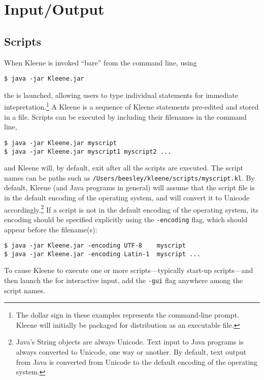 \section{Input/Output}

\subsection{Scripts}

When Kleene is invoked ``bare'' from the command line, using

\begin{Verbatim}
$ java -jar Kleene.jar
\end{Verbatim}

\noindent
the  is launched, allowing users to type individual statements
for immediate intepretation.\footnote{The dollar sign in these examples
	represents the command-line prompt.  Kleene will initially be
	packaged for distribution as an executable  file.} A Kleene
	 is a sequence of Kleene statements pre-edited and
	stored in a file.  Scripts can be executed by including their
	filenames in the command line,

\begin{Verbatim}
$ java -jar Kleene.jar myscript
$ java -jar Kleene.jar myscript1 myscript2 ...
\end{Verbatim}

\noindent
and Kleene will, by default, exit after all the scripts are executed.
The script names can be paths such as
\texttt{/Users/beesley/kleene/scripts/myscript.kl}.  By default, Kleene
(and Java programs in general) will assume that the script file is in the
default encoding of the operating system, and will convert it to Unicode
accordingly.\footnote{Java's String objects are always Unicode.  Text
input to Java programs is always converted to Unicode, one way or
another.  By default, text output from Java is converted from Unicode to
the default encoding of the operating system.}  If a script is not in the
default encoding of the operating system, its encoding should be specified
explicitly using the \texttt{-encoding} flag, which should appear before
the filename(s):

\begin{Verbatim}
$ java -jar Kleene.jar -encoding UTF-8    myscript
$ java -jar Kleene.jar -encoding Latin-1  myscript ...
\end{Verbatim}

\noindent
To cause Kleene to execute one or more scripts---typically start-up
scripts---and then launch the  for interactive input, add the
\texttt{-gui} flag anywhere among the script names.

